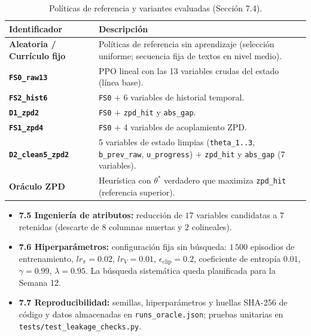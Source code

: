 \documentclass[10.5pt,a4paper]{article}
\newcommand{\code}[1]{\texttt{\color{InkDark}#1}}
\begin{document}
\begin{table}[H]
  \centering
  \caption{Políticas de referencia y variantes evaluadas (Sección 7.4).}
  \begin{tabularx}{\textwidth}{>{\leavevmode\bfseries\color{VividTeal}}p{4.3cm} X}
    \toprule
    \rowcolor{VividTeal} \textbf{\color{white}Identificador} & \textbf{\color{white}Descripción} \\
    \midrule
    Aleatoria / Currículo fijo & Políticas de referencia sin aprendizaje (selección uniforme; secuencia fija de textos en nivel medio). \\
    \rowcolor{RowTintTeal} \code{FS0\_raw13} & PPO lineal con las 13 variables crudas del estado (línea base). \\
    \code{FS2\_hist6} & \code{FS0} $+$ 6 variables de historial temporal. \\
    \rowcolor{RowTintTeal} \code{D1\_zpd2} & \code{FS0} $+$ \code{zpd\_hit} y \code{abs\_gap}. \\
    \code{FS1\_zpd4} & \code{FS0} $+$ 4 variables de acoplamiento ZPD. \\
    \rowcolor{RowTintTeal} \code{D2\_clean5\_zpd2} & 5 variables de estado limpias (\code{theta\_1..3}, \code{b\_prev\_raw}, \code{u\_progress}) $+$ \code{zpd\_hit} y \code{abs\_gap} ($7$ variables). \\
    Oráculo ZPD & Heurística con $\theta^*$ verdadero que maximiza \code{zpd\_hit} (referencia superior). \\
    \bottomrule
  \end{tabularx}
\end{table}

\begin{itemize}
  \item \textbf{7.5 Ingeniería de atributos:} reducción de $17$ variables candidatas a $7$ retenidas (descarte de $8$ columnas muertas y $2$ colineales).
  \item \textbf{7.6 Hiperparámetros:} configuración fija sin búsqueda: $1\,500$ episodios de entrenamiento, $lr_\pi = 0.02$, $lr_V = 0.01$, $\epsilon_{\text{clip}} = 0.2$, coeficiente de entropía $0.01$, $\gamma = 0.99$, $\lambda = 0.95$. La búsqueda sistemática queda planificada para la Semana 12.
  \item \textbf{7.7 Reproducibilidad:} semillas, hiperparámetros y huellas SHA-256 de código y datos almacenadas en \code{runs\_oracle.json}; pruebas unitarias en \code{tests/test\_leakage\_checks.py}.
\end{itemize}
\end{document}
